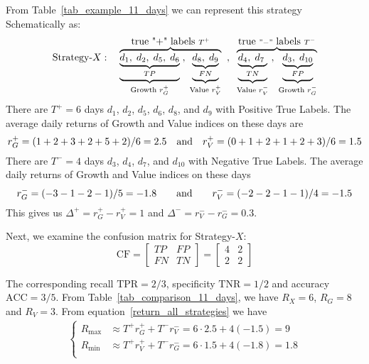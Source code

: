 \documentclass{article}
\begin{document}
From Table~\ref{tab_example_11_days} we can represent this strategy Schematically as: 
\begin{equation*}
    \hbox{Strategy-}X:  \quad \overbrace{\underbrace{\underbrace{ d_{1},\; d_{2},\; d_{5},\; d_{6}}_{TP}}_{\text{Growth }r_{G}^{+}}\; , 
    \;\underbrace{\underbrace{d_{8},\; d_{9}}_{FN}}_{\text{Value }r_{V}^{+}}}^{\hbox{true "+" labels } T^{+}}
    \;\; , \;\; 
    \overbrace{
\underbrace{\underbrace{d_{4},\; d_{7}\;}_{TN}}_{\text{Value }r_{V}^{-}}\; , \; 
\underbrace{\underbrace{d_{3},\; d_{10}}_{FP}}_{\text{Growth } r_{G}^{-}}}^{\hbox{true }"-"
\hbox{ labels } T^{-}} 
\end{equation*}
There are $T^{+}=6$ days $d_{1}$, $d_{2}$, $d_{5}$, $d_{6}$, $d_{8}$, and $d_{9}$ with Positive True Labels.
The average daily returns of Growth and Value indices on these days
are 
\begin{equation*}
r_{G}^{+}=(1+2+3+2+5+2)/6=2.5  \quad \hbox{and} \quad r_{V}^{+}=(0+1+2 + 1 + 2+3)/6=1.5
\end{equation*}
There are $T^{-}=4$ days $d_{3}$, $d_{4}$, $d_{7}$,  and $d_{10}$ with Negative True Labels.
The average daily returns of Growth and Value indices on these days
\begin{equation*}
r_{G}^{-}=(-3-1-2-1)/5=-1.8 \qquad \hbox{and} \qquad r_{V}^{-}=(-2-2-1-1)/4=-1.5
\end{equation*}
This gives us $\Delta^{+}=r_{G}^{+}-r_{V}^{+}=1$ and
$\Delta^{-}=r_{V}^{-}-r_{G}^{-} = 0.3$.

Next, we examine the confusion matrix for Strategy-$X$:
\begin{equation}
\text{CF}=\begin{bmatrix} TP & FP\\ FN & TN\end{bmatrix}=
\begin{bmatrix} 4 & 2 \\ 2 & 2 \end{bmatrix}
\label{confusion_x}
\end{equation}

The corresponding recall $\text{TPR}=2/3$, specificity $\text{TNR}=1/2$ and
accuracy $\text{ACC}=3/5$. 
From Table~\ref{tab_comparison_11_days}, we have $R_{X}=6$, $R_{G}=8$ and $R_{V}=3$. From
 equation~\eqref{return_all_strategies} we have
\begin{equation}
\begin{split}
\begin{cases}
      R_{\max} & \approx  T^{+}r_{G}^{+} + T^{-}r_{V}^{-}=
        6\cdot 2.5 + 4(-1.5)=9 \\
    R_{\min} & \approx  T^{+}r_{V}^{+} + T^{-}r_{G}^{-}=
    6\cdot 1.5 + 4(-1.8) =1.8\\
    \end{cases}
\end{split}
\label{return_x_example}
\end{equation}
\end{document}
